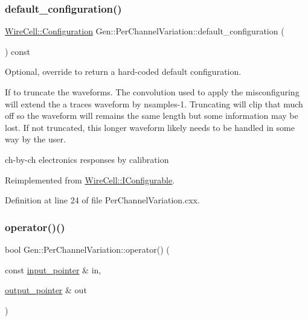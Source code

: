 \subsubsection{\texorpdfstring{default\+\_\+configuration()}{default\_configuration()}}
{\footnotesize\ttfamily \hyperlink{namespace_wire_cell_a9f705541fc1d46c608b3d32c182333ee}{Wire\+Cell\+::\+Configuration} Gen\+::\+Per\+Channel\+Variation\+::default\+\_\+configuration (\begin{DoxyParamCaption}{ }\end{DoxyParamCaption}) const\hspace{0.3cm}{\ttfamily [virtual]}}



Optional, override to return a hard-\/coded default configuration. 

If to truncate the waveforms. The convolution used to apply the misconfiguring will extend the a trace\textquotesingle{}s waveform by nsamples-\/1. Truncating will clip that much off so the waveform will remains the same length but some information may be lost. If not truncated, this longer waveform likely needs to be handled in some way by the user.

ch-\/by-\/ch electronics responses by calibration 

Reimplemented from \hyperlink{class_wire_cell_1_1_i_configurable_a54841b2da3d1ea02189478bff96f7998}{Wire\+Cell\+::\+I\+Configurable}.



Definition at line 24 of file Per\+Channel\+Variation.\+cxx.

\mbox{\label{class_wire_cell_1_1_gen_1_1_per_channel_variation_a3748bc71e6debe59dac26df158ffb3ff}} 
\subsubsection{\texorpdfstring{operator()()}{operator()()}}
{\footnotesize\ttfamily bool Gen\+::\+Per\+Channel\+Variation\+::operator() (\begin{DoxyParamCaption}\item[{const \hyperlink{class_wire_cell_1_1_i_function_node_a55c0946156df9b712b8ad1a0b59b2db6}{input\+\_\+pointer} \&}]{in,  }\item[{\hyperlink{class_wire_cell_1_1_i_function_node_afc02f1ec60d31aacddf64963f9ca650b}{output\+\_\+pointer} \&}]{out }\end{DoxyParamCaption})\hspace{0.3cm}{\ttfamily [virtual]}}



